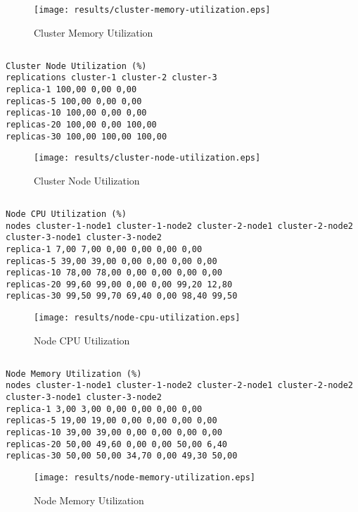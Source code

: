 \documentclass{elsart}
\begin{document}
\begin{figure}[ht]
\centering
\texttt{[image: results/cluster-memory-utilization.eps]}
\caption{Cluster Memory Utilization}\label{fig:cluster-memory-utilization.eps}
\end{figure}

\subsection{}

\begin{lstlisting}[caption={Cluster Node Utilization}]
Cluster Node Utilization (%)
replications cluster-1 cluster-2 cluster-3
replica-1 100,00 0,00 0,00
replicas-5 100,00 0,00 0,00
replicas-10 100,00 0,00 0,00
replicas-20 100,00 0,00 100,00
replicas-30 100,00 100,00 100,00
\end{lstlisting}

\begin{figure}[ht]
\centering
\texttt{[image: results/cluster-node-utilization.eps]}
\caption{Cluster Node Utilization}\label{fig:cluster-node-utilization.eps}
\end{figure}

\subsection{}

\begin{lstlisting}[caption={Node CPU Utilization}]
Node CPU Utilization (%)
nodes cluster-1-node1 cluster-1-node2 cluster-2-node1 cluster-2-node2 cluster-3-node1 cluster-3-node2
replica-1 7,00 7,00 0,00 0,00 0,00 0,00
replicas-5 39,00 39,00 0,00 0,00 0,00 0,00
replicas-10 78,00 78,00 0,00 0,00 0,00 0,00
replicas-20 99,60 99,00 0,00 0,00 99,20 12,80
replicas-30 99,50 99,70 69,40 0,00 98,40 99,50
\end{lstlisting}

\begin{figure}[ht]
\centering
\texttt{[image: results/node-cpu-utilization.eps]}
\caption{Node CPU Utilization}\label{fig:node-cpu-utilization.eps}
\end{figure}

\subsection{}

\begin{lstlisting}[caption={Node Memory Utilization}]
Node Memory Utilization (%)
nodes cluster-1-node1 cluster-1-node2 cluster-2-node1 cluster-2-node2 cluster-3-node1 cluster-3-node2
replica-1 3,00 3,00 0,00 0,00 0,00 0,00
replicas-5 19,00 19,00 0,00 0,00 0,00 0,00
replicas-10 39,00 39,00 0,00 0,00 0,00 0,00
replicas-20 50,00 49,60 0,00 0,00 50,00 6,40
replicas-30 50,00 50,00 34,70 0,00 49,30 50,00
\end{lstlisting}

\begin{figure}[ht]
\centering
\texttt{[image: results/node-memory-utilization.eps]}
\caption{Node Memory Utilization}\label{fig:node-memory-utilization.eps}
\end{figure}
\end{document}

